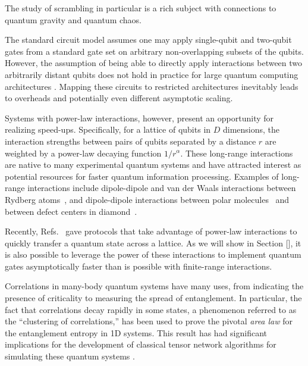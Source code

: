 


The study of scrambling in particular is a rich subject with connections to quantum gravity and quantum chaos.



The standard circuit model assumes one may apply single-qubit and two-qubit gates from a standard gate set on arbitrary non-overlapping subsets of the qubits.
However, the assumption of being able to directly apply interactions between two arbitrarily distant qubits does not hold in practice for large quantum computing architectures \cite{Monroe2014,Linke2017,Bapat2018,Childs2019c,Schoute2022}.
Mapping these circuits to restricted architectures inevitably leads to overheads and potentially even different asymptotic scaling.

Systems with power-law interactions, however, present an opportunity for realizing speed-ups.
Specifically, for a lattice of qubits in $D$ dimensions, the interaction strengths between pairs of qubits separated by a distance $r$ are weighted by a power-law decaying function $1/r^\alpha$. These long-range interactions are native to many experimental quantum systems and have attracted interest as potential resources for faster quantum information processing. Examples of long-range interactions include dipole-dipole and van der Waals interactions between Rydberg atoms~\cite{Saffman2010,Weimer2012}, and dipole-dipole interactions between polar molecules~\cite{Yan2013} and between defect centers in diamond~\cite{Yao2012,Weimer2012}.

Recently, Refs.~\cite{Eldredge2017,Guo2020,Tran2020,kuwaharaStrictlyLinearLight2020} gave protocols that take advantage of power-law interactions to quickly transfer a quantum state across a lattice.
As we will show in Section [], it is also possible to leverage the power of these interactions to implement quantum gates asymptotically faster than is possible with finite-range interactions.


Correlations in many-body quantum systems have many uses, from indicating the presence of criticality to measuring the spread of entanglement. In particular, the fact that correlations decay rapidly in some states, a phenomenon referred to as the “clustering of correlations,” has been used to prove the pivotal \emph{area law} for the entanglement entropy in 1D systems. This result has had significant implications for the development of classical tensor network algorithms for simulating these quantum systems \cite{Hastings07}.


